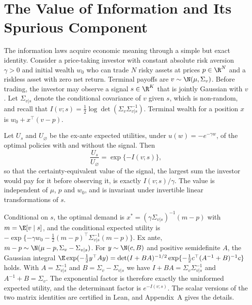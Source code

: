 \section*{The Value of Information and Its Spurious Component}

The information laws acquire economic meaning through a simple but exact identity. Consider a price-taking investor with constant absolute risk aversion $\gamma>0$ and initial wealth $w_0$ who can trade $N$ risky assets at prices $p\in\R^N$ and a riskless asset with zero net return. Terminal payoffs are $v\sim\N(\mu,\Sigma_v)$. Before trading, the investor may observe a signal $s\in\R^K$ that is jointly Gaussian with $v$. Let $\Sigma_{v|s}$ denote the conditional covariance of $v$ given $s$, which is non-random, and recall that $I(v;s)=\tfrac12\log\det(\Sigma_v\Sigma_{v|s}^{-1})$. Terminal wealth for a position $x$ is $w_0+x^\top(v-p)$.

\begin{theorem*}
Let $U_s$ and $U_\varnothing$ be the ex-ante expected utilities, under $u(w)=-e^{-\gamma w}$, of the optimal policies with and without the signal. Then
\[
 \frac{U_s}{U_\varnothing}=\exp\{-I(v;s)\},
\]
so that the certainty-equivalent value of the signal, the largest sum the investor would pay for it before observing it, is exactly $I(v;s)/\gamma$. The value is independent of $\mu$, $p$ and $w_0$, and is invariant under invertible linear transformations of $s$.
\end{theorem*}

Conditional on $s$, the optimal demand is $x^*=(\gamma\Sigma_{v|s})^{-1}(m-p)$ with $m=\E[v\mid s]$, and the conditional expected utility is $-\exp\{-\gamma w_0-\tfrac12(m-p)^\top\Sigma_{v|s}^{-1}(m-p)\}$. Ex ante, $m-p\sim\N(\mu-p,\Sigma_v-\Sigma_{v|s})$. For $y\sim\N(c,B)$ and positive semidefinite $A$, the Gaussian integral $\E\exp(-\tfrac12y^\top Ay)=\det(I+BA)^{-1/2}\exp\{-\tfrac12c^\top(A^{-1}+B)^{-1}c\}$ holds. With $A=\Sigma_{v|s}^{-1}$ and $B=\Sigma_v-\Sigma_{v|s}$ we have $I+BA=\Sigma_v\Sigma_{v|s}^{-1}$ and $A^{-1}+B=\Sigma_v$. The exponential factor is therefore exactly the uninformed expected utility, and the determinant factor is $e^{-I(v;s)}$. The scalar versions of the two matrix identities are certified in Lean, and Appendix~A gives the details.

